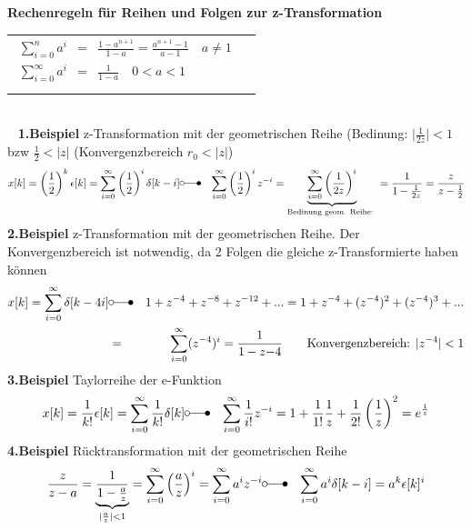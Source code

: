 \textbf{Rechenregeln für Reihen und Folgen zur z-Transformation}
\begin{tabular}{ll}
 \addtolength{\jot}{2mm}
 \parbox{7cm}{
 \begin{eqnarray*}
  \sum_{i=0}^n a^i &=& \frac{1-a^{n+1}}{1-a} = \frac{a^{n+1}-1}{a-1}  \quad a \neq 1\\
 \sum_{i=0}^{\infty} a^i &=& \frac{1}{1-a}  \quad 0 < a < 1\\
 \end{eqnarray*}}
 &
 \addtolength{\jot}{2mm}
 \parbox{5cm}{

}
\end{tabular}\\~
\vspace{6pt}
\textbf{1.Beispiel} \quad z-Transformation mit der geometrischen Reihe (Bedinung: $\vert \frac{1}{2z} \vert < 1$ bzw $\frac{1}{2} < \vert z \vert$ (Konvergenzbereich $r_0 < \vert z \vert$)
\begin{eqnarray*}
x[k] = \left( \frac{1}{2} \right)^k \epsilon[k] = \sum_{i=0}^{\infty}\left( \frac{1}{2} \right)^i \delta[k-i] &\laplace& \sum_{i=0}^{\infty}\left( \frac{1}{2} \right)^i z^{-i} = \underbrace{\sum_{i=0}^{\infty}\left( \frac{1}{2z} \right)^i}_{\text{Bedinung geom. Reihe: }} = \frac{1}{1-\frac{1}{2z}} = \frac{z}{z-\frac{1}{2}}
\end{eqnarray*}
\textbf{2.Beispiel} \quad z-Transformation mit der geometrischen Reihe. Der Konvergenzbereich ist notwendig, da 2 Folgen die gleiche z-Transformierte haben können
\begin{eqnarray*}
x[k] =  \sum_{i=0}^{\infty} \delta[k-4i] &\laplace& 1 + z^{-4} + z^{-8} + z^{-12}+ ... = 1 + z^{-4} + (z^{-4})^2 + (z^{-4})^3 + ...\\
&=& \sum_{i=0}^{\infty} (z^{-4})^i = \frac{1}{1-z{-4}} \qquad \text{Konvergenzbereich: $\vert z^{-4} \vert < 1$}
\end{eqnarray*}
\vfill\columnbreak
\textbf{3.Beispiel} \quad Taylorreihe der e-Funktion
\begin{eqnarray*}
x[k] = \frac{1}{k!} \epsilon[k] = \sum_{i=0}^{\infty} \frac{1}{k!} \delta[k] &\laplace& \sum^{\infty}_{i=0} \frac{1}{i!}z^{-i} = 1+ \frac{1}{1!}\frac{1}{z} + \frac{1}{2!}\left(\frac{1}{z}\right)^2 =e^{\frac{1}{z}}
\end{eqnarray*}
\textbf{4.Beispiel} \quad Rücktransformation mit der geometrischen Reihe
\begin{eqnarray*}
\frac{z}{z-a} = \underbrace{\frac{1}{1-\frac{a}{z}}}_{\vert \frac{a}{z} \vert < 1} = \sum_{i=0}^{\infty} \left( \frac{a}{z} \right)^i = \sum_{i=0}^{\infty} a^i z^{-i} &\laplace& \sum_{i=0}^{\infty} a^i \delta[k-i] =  a^k \epsilon[k]^i
\end{eqnarray*}
